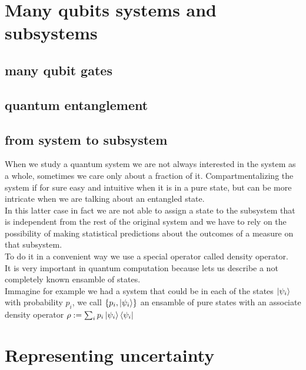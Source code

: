 \documentclass{article}
\begin{document}
\newpage

\section{Many qubits systems and subsystems}



\subsection{many qubit gates}

\subsection{quantum entanglement}


\subsection{from system to subsystem}

When we study a quantum system we are not always interested in the
system
as a whole, sometimes we care only about a fraction of it.
Compartmentalizing the system if for sure easy and intuitive when it
is in a pure state, but can be more intricate when we are talking about
an entangled state.\\
In this latter case in fact we are not able to assign a state to the
subsystem that is independent from the rest of the original system
and we have to rely on the possibility of making statistical
predictions
about the outcomes of a measure on that subsystem.\\
To do it in a convenient way we use a special operator called density
operator.\\
It is very important in quantum computation because lets us describe
a not completely known ensamble of states.\\
Immagine for example we had a system that could be in each of the
states
$\ket{\psi_i}$ with probability $p_i$, we call $\{p_i,\ket{\psi_i}\}$ an
ensamble of pure states with an associate density operator
$\rho:=\sum_i p_i \ket{\psi_i}\bra{\psi_i} $



\section{Representing uncertainty}
\end{document}
